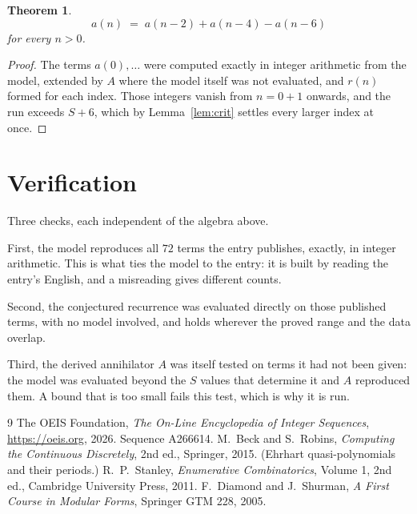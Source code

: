 \documentclass[11pt,a4paper]{article}
\theoremstyle{plain}
\newtheorem{theorem}{Theorem}
\theoremstyle{definition}
\begin{document}
\begin{theorem}
\[
a(n)\;=\;a(n-2) + a(n-4) - a(n-6)
\]
for every $n>0$.
\end{theorem}

\begin{proof}
The terms $a(0),\dots$ were computed exactly in integer arithmetic from the model, extended by
$A$ where the model itself was not evaluated, and $r(n)$ formed for each index. Those integers
vanish from $n=0+1$ onwards, and the run exceeds $S+6$, which by
Lemma~\ref{lem:crit} settles every larger index at once.
\end{proof}

\section{Verification}

Three checks, each independent of the algebra above.

First, the model reproduces all $72$ terms the entry publishes, exactly, in integer
arithmetic. This is what ties the model to the entry: it is built by reading the entry's
English, and a misreading gives different counts.

Second, the conjectured recurrence was evaluated directly on those published terms, with no
model involved, and holds wherever the proved range and the data overlap.

Third, the derived annihilator $A$ was itself tested on terms it had not been given: the model
was evaluated beyond the $S$ values that determine it and $A$ reproduced them. A bound that is
too small fails this test, which is why it is run.

\begin{thebibliography}{9}
 The OEIS Foundation, \emph{The On-Line Encyclopedia of Integer
Sequences}, \url{https://oeis.org}, 2026. Sequence A266614.
 M.~Beck and S.~Robins, \emph{Computing the Continuous Discretely},
2nd ed., Springer, 2015. (Ehrhart quasi-polynomials and their periods.)
 R.~P.~Stanley, \emph{Enumerative Combinatorics}, Volume 1, 2nd ed.,
Cambridge University Press, 2011.
 F.~Diamond and J.~Shurman, \emph{A First Course in Modular Forms},
Springer GTM 228, 2005.
\end{thebibliography}
\end{document}
